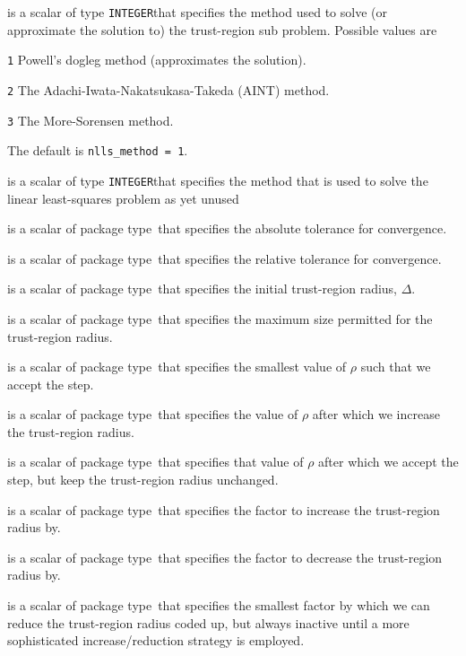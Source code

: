 \documentclass{hslspec}
\newcommand{\scalarinteger}{is a scalar of type {\tt INTEGER}}
\newcommand{\scalarreal}{is a scalar of package type\ }
\begin{document}
\begin{description}
\begin{description}
 \scalarinteger that specifies the method used to solve (or approximate the solution to) the trust-region sub problem.  Possible values are
\begin{description}
  \item{\tt 1} Powell's dogleg method (approximates the solution).
  \item{\tt 2} The Adachi-Iwata-Nakatsukasa-Takeda (AINT) method.
  \item{\tt 3} The More-Sorensen method.
\end{description}
The default is {\tt nlls\_method = 1}.

 \scalarinteger that specifies the method that is used to solve the linear least-squares problem {\color{red} as yet unused}

 \scalarreal that specifies the absolute tolerance for convergence.

 \scalarreal that specifies the relative tolerance for convergence.

 \scalarreal that specifies the initial trust-region radius, $\Delta$.

 \scalarreal that specifies the maximum size permitted for the trust-region radius.

 \scalarreal that specifies the smallest value of $\rho$ such that we accept the step.  

 \scalarreal that specifies the value of $\rho$ after which we increase the trust-region radius.

 \scalarreal that specifies that value of $\rho$ after which we accept the step, but keep the trust-region radius unchanged.

 \scalarreal that specifies the factor to increase the trust-region radius by.

 \scalarreal that specifies the factor to decrease the trust-region radius by.

 \scalarreal that specifies the smallest factor by which we can reduce the trust-region radius {\color{red} coded up, but always inactive until a more sophisticated increase/reduction strategy is employed}.

\end{description}



\end{description}
\end{document}
